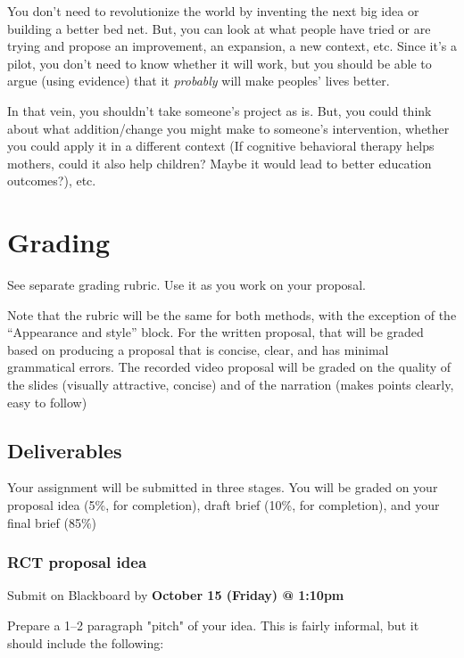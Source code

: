 \documentclass[11pt]{article}
\begin{document}
You don't need to revolutionize the world by inventing the next big idea
or building a better bed net. But, you can look at what people have
tried or are trying and propose an improvement, an expansion, a new
context, etc. Since it's a pilot, you don't need to know whether it will
work, but you should be able to argue (using evidence) that it
\emph{probably} will make peoples' lives better.

In that vein, you shouldn't take someone's project as is. But, you could
think about what addition/change you might make to someone's
intervention, whether you could apply it in a different context (If
cognitive behavioral therapy helps mothers, could it also help children?
Maybe it would lead to better education outcomes?), etc.

\hypertarget{grading-2}{%
\section*{Grading}\label{grading-2}}

See separate grading rubric. Use it as you work on your proposal.

Note that the rubric will be the same for both methods, with the
exception of the ``Appearance and style'' block. For the written
proposal, that will be graded based on producing a proposal that is
concise, clear, and has minimal grammatical errors. The recorded video
proposal will be graded on the quality of the slides (visually
attractive, concise) and of the narration (makes points clearly, easy to
follow)

\hypertarget{deliverables-1}{%
\subsection*{Deliverables}\label{deliverables-1}}



Your assignment will be submitted in three stages. You will be graded on your proposal idea (5\%, for completion), draft brief (10\%, for completion), and your final brief (85\%)

\subsubsection*{RCT proposal idea}

Submit on Blackboard by \textbf{October 15 (Friday) @ 1:10pm}

Prepare a 1–2 paragraph "pitch" of your idea. This is fairly informal, but it should include the following: 
\end{document}
